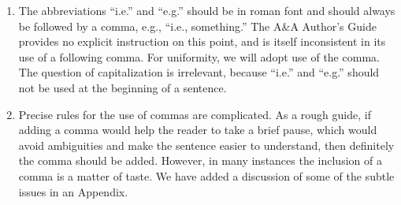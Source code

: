 \documentclass[letterpaper,11pt]{article}
\begin{document}
\begin{enumerate}

\item The abbreviations ``i.e.'' and ``e.g.'' should be in roman font and
should always be followed by a comma, e.g., ``i.e., something.''  The A\&A
Author's Guide provides no explicit instruction on this point, and is itself
inconsistent in its use of a following comma.  For uniformity, we will adopt
use of the comma.  The question of capitalization is irrelevant, because
``i.e.'' and ``e.g.'' should not be used at the beginning of a sentence.

\item Precise rules for the use of commas are complicated.  As a rough
guide, if adding a comma would help the reader to take a brief pause, which
would avoid ambiguities and make the sentence easier to understand, then
definitely the comma should be added.  However, in many instances the
inclusion of a comma is a matter of taste.  We have added a discussion of
some of the subtle issues in an Appendix.




\end{enumerate}
\end{document}
